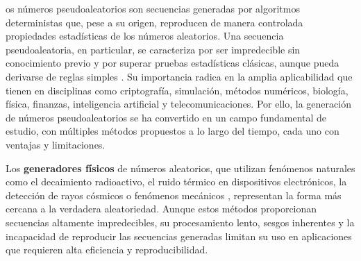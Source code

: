 \documentclass[../Main.tex]{subfiles}
\begin{document}


\MakeLowercase{os} números pseudoaleatorios son secuencias generadas por algoritmos deterministas que, pese a su origen, reproducen de manera controlada propiedades estadísticas de los números aleatorios. Una secuencia pseudoaleatoria, en particular, se caracteriza por ser impredecible sin conocimiento previo y por superar pruebas estadísticas clásicas, aunque pueda derivarse de reglas simples \cite{Lehmer1951}. Su importancia radica en la amplia aplicabilidad que tienen en disciplinas como criptografía, simulación, métodos numéricos, biología, física, finanzas, inteligencia artificial y telecomunicaciones. Por ello, la generación de números pseudoaleatorios se ha convertido en un campo fundamental de estudio, con múltiples métodos propuestos a lo largo del tiempo, cada uno con ventajas y limitaciones.

Los \textbf{generadores físicos} de números aleatorios, que utilizan fenómenos naturales como el decaimiento radioactivo, el ruido térmico en dispositivos electrónicos, la detección de rayos cósmicos o fenómenos mecánicos  \cite{Madiot2022,Stipcevic2014}, representan la forma más cercana a la verdadera aleatoriedad. Aunque estos métodos proporcionan secuencias altamente impredecibles, su procesamiento lento, sesgos inherentes y la incapacidad de reproducir las secuencias generadas limitan su uso en aplicaciones que requieren alta eficiencia y reproducibilidad.
\end{document}
